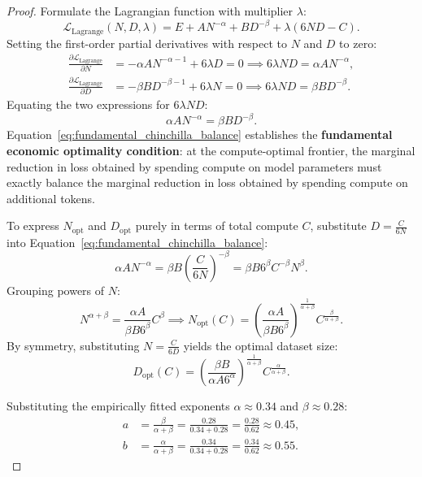 \documentclass[../../main.tex]{subfiles}
\begin{document}
\begin{proof}
Formulate the Lagrangian function with multiplier $\lambda$:
\begin{equation}
\label{eq:chinchilla_lagrangian}
\mathcal{L}_{\text{Lagrange}}(N, D, \lambda) = E + A N^{-\alpha} + B D^{-\beta} + \lambda (6ND - C).
\end{equation}
Setting the first-order partial derivatives with respect to $N$ and $D$ to zero:
\begin{align}
\label{eq:lagrange_deriv_n}
\frac{\partial \mathcal{L}_{\text{Lagrange}}}{\partial N} &= -\alpha A N^{-\alpha-1} + 6\lambda D = 0 \implies 6\lambda N D = \alpha A N^{-\alpha}, \\
\label{eq:lagrange_deriv_d}
\frac{\partial \mathcal{L}_{\text{Lagrange}}}{\partial D} &= -\beta B D^{-\beta-1} + 6\lambda N = 0 \implies 6\lambda N D = \beta B D^{-\beta}.
\end{align}
Equating the two expressions for $6\lambda N D$:
\begin{equation}
\label{eq:fundamental_chinchilla_balance}
\alpha A N^{-\alpha} = \beta B D^{-\beta}.
\end{equation}
Equation~\eqref{eq:fundamental_chinchilla_balance} establishes the \textbf{fundamental economic optimality condition}: at the compute-optimal frontier, the marginal reduction in loss obtained by spending compute on model parameters must exactly balance the marginal reduction in loss obtained by spending compute on additional tokens.

To express $N_{\text{opt}}$ and $D_{\text{opt}}$ purely in terms of total compute $C$, substitute $D = \frac{C}{6N}$ into Equation~\eqref{eq:fundamental_chinchilla_balance}:
\begin{equation}
\alpha A N^{-\alpha} = \beta B \left( \frac{C}{6N} \right)^{-\beta} = \beta B 6^\beta C^{-\beta} N^\beta.
\end{equation}
Grouping powers of $N$:
\begin{equation}
N^{\alpha + \beta} = \frac{\alpha A}{\beta B 6^\beta} C^\beta \implies N_{\text{opt}}(C) = \left( \frac{\alpha A}{\beta B 6^\beta} \right)^{\frac{1}{\alpha + \beta}} C^{\frac{\beta}{\alpha + \beta}}.
\end{equation}
By symmetry, substituting $N = \frac{C}{6D}$ yields the optimal dataset size:
\begin{equation}
D_{\text{opt}}(C) = \left( \frac{\beta B}{\alpha A 6^\alpha} \right)^{\frac{1}{\alpha + \beta}} C^{\frac{\alpha}{\alpha + \beta}}.
\end{equation}

Substituting the empirically fitted exponents $\alpha \approx 0.34$ and $\beta \approx 0.28$:
\begin{align}
a &= \frac{\beta}{\alpha + \beta} = \frac{0.28}{0.34 + 0.28} = \frac{0.28}{0.62} \approx 0.45, \\
b &= \frac{\alpha}{\alpha + \beta} = \frac{0.34}{0.34 + 0.28} = \frac{0.34}{0.62} \approx 0.55.
\end{align}
\end{proof}
\end{document}
